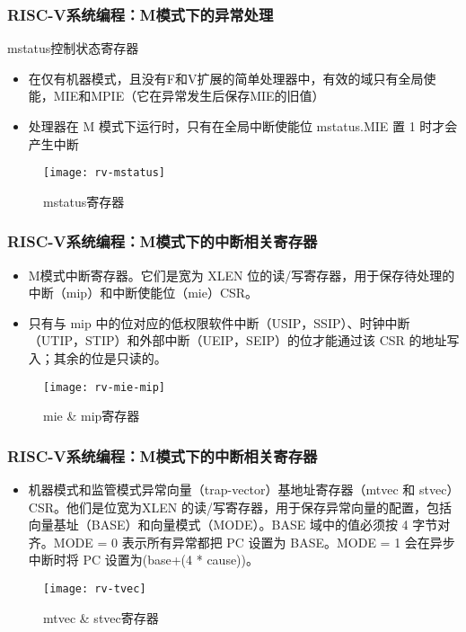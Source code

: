\begin{frame}
    \frametitle{RISC-V系统编程：M模式下的异常处理}
     mstatus控制状态寄存器
    \begin{itemize}
        \item 在仅有机器模式，且没有F和V扩展的简单处理器中，有效的域只有全局使能，MIE和MPIE（它在异常发生后保存MIE的旧值）
        \item 处理器在 M 模式下运行时，只有在全局中断使能位 mstatus.MIE 置 1 时才会产生中断
        
    \end{itemize}
    
    \begin{figure}
    \centering
    \texttt{[image: rv-mstatus]}
    \caption{mstatus寄存器}
    \end{figure}
    
\end{frame}


\begin{frame}
    \frametitle{RISC-V系统编程：M模式下的中断相关寄存器}
    \begin{itemize}
        \item M模式中断寄存器。它们是宽为 XLEN 位的读/写寄存器，用于保存待处理的中断（mip）和中断使能位（mie）CSR。
        \item 只有与 mip 中的位对应的低权限软件中断（USIP，SSIP）、时钟中断（UTIP，STIP）和外部中断（UEIP，SEIP）的位才能通过该 CSR 的地址写入；其余的位是只读的。
    \end{itemize}   
    \begin{figure}
        \centering
        \texttt{[image: rv-mie-mip]}
        \caption{mie \&  mip寄存器}
    \end{figure}
\end{frame}


\begin{frame}
    \frametitle{RISC-V系统编程：M模式下的中断相关寄存器}
    \begin{itemize}
        \item 机器模式和监管模式异常向量（trap-vector）基地址寄存器（mtvec 和 stvec）CSR。他们是位宽为XLEN 的读/写寄存器，用于保存异常向量的配置，包括向量基址（BASE）和向量模式（MODE）。BASE 域中的值必须按 4 字节对齐。MODE = 0 表示所有异常都把 PC 设置为 BASE。MODE = 1 会在异步中断时将 PC 设置为(base+(4 * cause))。
    \end{itemize}   
    \begin{figure}
        \centering
        \texttt{[image: rv-tvec]}
        \caption{mtvec  \& stvec寄存器}
    \end{figure}
\end{frame}

